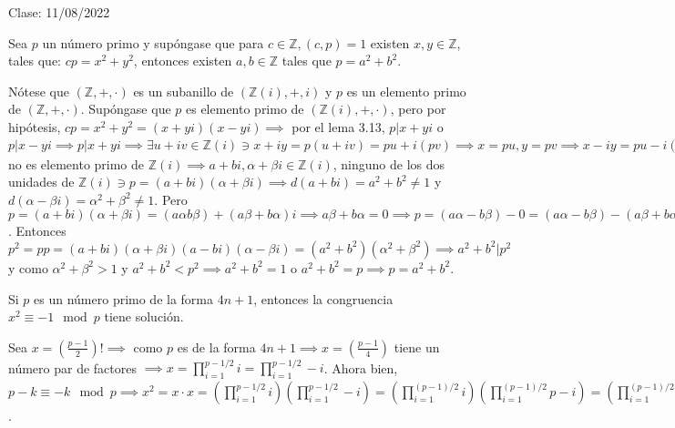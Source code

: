 Clase: 11/08/2022

\begin{cajita}
    \begin{teorema}[Wilson]
    \end{teorema}
\end{cajita}

\begin{lema}[3.15]
    Sea $p$ un número primo y supóngase que para $c\in\mathbb{Z}, (c,p)=1$ existen $x,y\in\mathbb{Z}$, tales que: $cp=x^2+y^2$, entonces existen $a,b\in\mathbb{Z}$ tales que $p=a^2+b^2$.
    \begin{dem}
        Nótese que $(\mathbb{Z},+,\cdot)$ es un subanillo de $(\mathbb{Z}(i),+,i)$ y $p$ es un elemento primo de $(\mathbb{Z},+,\cdot)$. Supóngase que $p$ es elemento primo de $(\mathbb{Z}(i),+,\cdot)$, pero por hipótesis, $cp=x^2+y^2=(x+yi)(x-yi)\implies$ por el lema 3.13, $p|x+yi$ o $p|x-yi\implies p|x+yi\implies \exists u+iv\in\mathbb{Z}(i)\ni x+iy = p(u+iv)=pu+i(pv)\implies x=pu,y=pv\implies x-iy = pu-i(pv)=p(u-iv)\implies p|x-yi\implies p^2|(x+iy)(x-iy)=cp\implies p|c\implies 1=(p,c)>p(\to\gets)\implies p$ no es elemento primo de $\mathbb{Z}(i)\implies a+bi, \alpha +\beta i\in \mathbb{Z}(i)$, ninguno de los dos unidades de $\mathbb{Z}(i)\ni p=(a+bi)(\alpha+\beta i)\implies d(a+bi)=a^2+b^2\neq 1$ y $d(\alpha-\beta i)=\alpha^2+\beta^2\neq 1$. Pero $p=(a+bi)(\alpha +\beta i)=(a\alpha b\beta)+(a\beta +b\alpha)i\implies a\beta +b\alpha =0\implies p=(a\alpha-b\beta)-0=(a\alpha -b\beta)-(a\beta +b\alpha)i=a\alpha -a\beta i -b\beta-b\alpha i=a(\alpha -\beta i)-bi(\alpha - \beta i)=(a-bi)(\alpha -\beta i)$. Entonces $p^2=pp=(a+bi)(\alpha+\beta i)(a-bi)(\alpha -\beta i)=(a^2+b^2)(\alpha^2+\beta^2)\implies a^2+b^2|p^2$ y como $\alpha^2+\beta^2>1$ y $a^2+b^2<p^2\implies a^2+b^2=1$ o $a^2+b^2=p\implies p=a^2+b^2$. 
    \end{dem}
\end{lema}

\begin{lema}[3.16]
    Si $p$ es un número primo de la forma $4n+1$, entonces la congruencia $x^2\equiv -1\mod p$ tiene solución.
    \begin{dem}
        Sea $x=\left(\frac{p-1}{2}\right)!\implies$ como $p$ es de la forma $4n+1\implies x=\left(\frac{p-1}{4}\right)$ tiene un número par de factores $\implies x=\prod_{i=1}^{p-1/2}i = \prod_{i=1}^{p-1/2}-i$. Ahora bien, $p-k\equiv -k\mod p\implies x^2=x\cdot x = \left(\prod_{i=1}^{p-1/2} i\right)\left(\prod_{i=1}^{p-1/2}-i\right) = \left(\prod_{i=1}^{(p-1)/2}i\right)\left(\prod_{i=1}^{(p-1)/2}p-i\right)=\left(\prod_{i=1}^{(p-1)/2}i\right)\left(\prod_{i=\frac{p-1}{2}+1}^{p-1}i\right)=\prod_{i=1}^{p-1}i=(p-1)=\equiv -1 \mod p $.
    \end{dem}
\end{lema}

